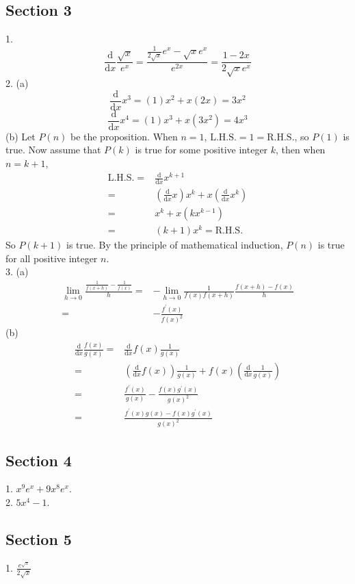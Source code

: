 \subsection{Section 3}
1. 
$$\frac{\mathrm d}{\mathrm dx}\frac{\sqrt{x}}{e^x}=\frac{\frac{1}{2\sqrt{x}}e^x-\sqrt{x}e^x}{e^{2x}}=\frac{1-2x}{2\sqrt{x}e^x}$$
2. (a)
$$\frac{\mathrm d}{\mathrm dx}x^3=(1)x^2+x(2x)=3x^2$$
$$\frac{\mathrm d}{\mathrm dx}x^4=(1)x^3+x(3x^2)=4x^3$$
(b) Let $P(n)$ be the proposition. When $n=1$, $\mathrm{L.H.S.}=1=\mathrm{R.H.S.}$, so $P(1)$ is true. Now assume that $P(k)$ is true for some positive integer $k$, then when $n=k+1$,
\begin{align*}
    \mathrm{L.H.S.}
    =&\frac{\mathrm d}{\mathrm dx}x^{k+1}\\
    =&\left(\frac{\mathrm d}{\mathrm dx}x\right)x^k+x\left(\frac{\mathrm d}{\mathrm dx}x^k\right)\\
    =&x^k+x(kx^{k-1})\\
    =&(k+1)x^k=\mathrm{R.H.S.}
\end{align*}
So $P(k+1)$ is true. By the principle of mathematical induction, $P(n)$ is true for all positive integer $n$.\\
3. (a)
\begin{align*}
    \lim_{h\to0}\frac{\frac{1}{f(x+h)}-\frac{1}{f(x)}}{h}
    =&-\lim_{h\to0}\frac{1}{f(x)f(x+h)}\frac{f(x+h)-f(x)}{h}\\
    =&-\frac{f^\prime(x)}{f(x)^2}
\end{align*}
(b)
\begin{align*}
    \frac{\mathrm d}{\mathrm dx}\frac{f(x)}{g(x)}
    =&\frac{\mathrm d}{\mathrm dx}f(x)\frac{1}{g(x)}\\
    =&\left(\frac{\mathrm d}{\mathrm dx}f(x)\right)\frac{1}{g(x)}+f(x)\left(\frac{\mathrm d}{\mathrm dx}\frac{1}{g(x)}\right)\\
    =&\frac{f^\prime(x)}{g(x)}-\frac{f(x)g^\prime(x)}{g(x)^2}\\
    =&\frac{f^\prime(x)g(x)-f(x)g^\prime(x)}{g(x)^2}
\end{align*}

\subsection{Section 4}
1. $x^9e^x+9x^8e^x$.\\
2. $5x^4-1$.

\subsection{Section 5}
1. $\frac{e^{\sqrt{x}}}{2\sqrt{x}}$

